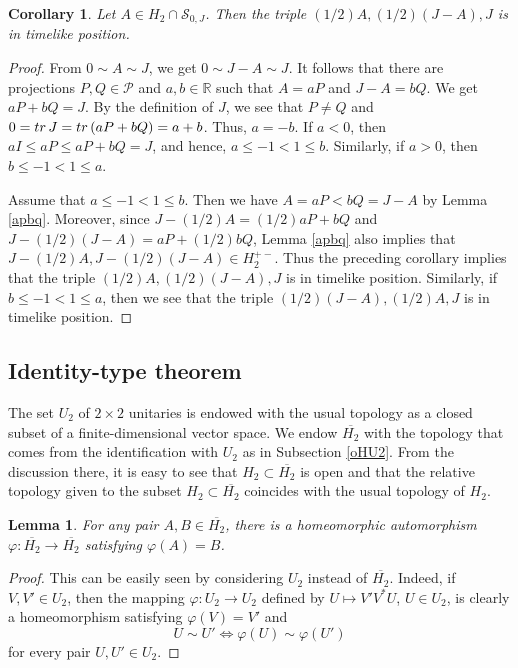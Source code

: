 \documentclass[10pt,a4paper]{amsart}
\providecommand{\index}[1]{}
\newcommand\cP{{\mathcal{P}}}
\newcommand\oH{{\overline{H_2}}}
\newtheorem{lemma}[theorem]{Lemma}
\newtheorem{corollary}[theorem]{Corollary}
\theoremstyle{definition}
\theoremstyle{remark}
\numberwithin{subsection}{section}
\numberwithin{equation}{section}
\begin{document}
\begin{corollary}\label{SJS}
Let $A\in H_2\cap \mathcal{S}_{0, J}$. Then the triple $(1/2)A, (1/2)(J-A), J$ is in timelike position.
\end{corollary}
\begin{proof}
From $0\sim A\sim J$, we get $0\sim J-A\sim J$. 
It follows that there are projections $P, Q\in \cP$ and $a,b\in \mathbb{R}$ such that $A=aP$ and $J-A=bQ$.
We get $aP+bQ=J$. By the definition of $J$, we see that $P\neq Q$ and $0 = {\rm tr}\, J = {\rm tr}\, (aP + bQ) = a+b$. Thus, $a=-b$. If $a < 0$, then $aI \le aP \le aP + bQ = J$, and hence, $a\leq -1<1\leq b$. Similarly, if $a>0$, then $b\leq -1<1\leq a$.

Assume that $a\leq -1<1\leq b$. Then we have $A=aP<bQ=J-A$ by Lemma \ref{apbq}. 
Moreover, since $J-(1/2)A=(1/2)aP+bQ$ and $J-(1/2)(J-A)=aP+(1/2)bQ$, Lemma \ref{apbq} also implies that $J-(1/2)A, J-(1/2)(J-A)\in H_2^{+-}$.
Thus the preceding corollary implies that the triple $(1/2)A, (1/2)(J-A), J$ is in timelike position.
Similarly, if $b\leq -1<1\leq a$, then we see that the triple $(1/2)(J-A), (1/2)A, J$ is in timelike position.
\end{proof}







\subsection{Identity-type theorem}\label{identity-type theorem}\index{identity-type theorem}
The set $U_2$ of $2\times 2$ unitaries is endowed with the usual topology as a closed subset of a finite-dimensional vector space.   
We endow $\oH$ with the topology that comes from the identification with $U_2$ as in Subsection \ref{oHU2}. 
From the discussion there, it is easy to see that $H_2\subset \oH$ is open and that the relative topology given to the subset $H_2\subset \oH$ coincides with the usual topology of $H_2$.


\begin{lemma}\label{srtsrt}
For any pair $A, B\in \oH$, there is a homeomorphic automorphism $\varphi\colon \oH\to\oH$ satisfying $\varphi(A)=B$.
\end{lemma}
\begin{proof}
This can be easily seen by considering $U_2$ instead of $\oH$. 
Indeed, if $V,V'\in U_2$, then the mapping $\varphi\colon U_2\to U_2$ defined by $U\mapsto V'V^*U$, $U\in U_2$, is clearly a homeomorphism satisfying $\varphi(V)=V'$ and 
\[
U\sim U'\iff \varphi(U)\sim \varphi(U')
\] 
for every pair $U, U'\in U_2$.
\end{proof}
\end{document}
